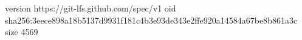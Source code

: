 version https://git-lfs.github.com/spec/v1
oid sha256:3eece898a18b5137d9931f181c4b3e93de343e2ffe920a14584a67be8b861a3c
size 4569
